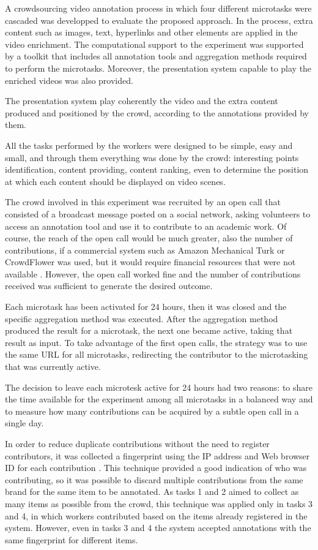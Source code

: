 A crowdsourcing video annotation process in which four different microtasks were cascaded was developped to evaluate the proposed approach. In the process, extra content such as images, text, hyperlinks and other elements are applied in the video enrichment. The computational support to the experiment was supported by a toolkit that includes all annotation tools and aggregation methods required to perform the microtasks. Moreover, the presentation system capable to play the enriched videos was also provided.

The presentation system play coherently the video and the extra content produced and positioned by the crowd, according to the annotations provided by them.

All the tasks performed by the workers were designed to be simple, easy and small, and through them everything was done by the crowd: interesting points identification, content providing, content ranking, even to determine the position at which each content should be displayed on video scenes.

The crowd involved in this experiment was recruited by an open call that consisted of a broadcast message posted on a social network, asking volunteers to access an annotation tool and use it to contribute to an academic work. Of course, the reach of the open call would be much greater, also the number of contributions, if a commercial system such as Amazon Mechanical Turk or CrowdFlower was used, but it would require financial resources that were not available \cite{Difallah:2015:DMC:2736277.2741685}. However, the open call worked fine and the number of contributions received was sufficient to generate the desired outcome.

Each microtask has been activated for 24 hours, then it was closed and the specific aggregation method was executed. After the aggregation method produced the result for a microtask, the next one became active, taking that result as input. To take advantage of the first open calls, the strategy was to use the same URL for all microtasks, redirecting the contributor to the microtasking that was currently active.

The decision to leave each microtesk active for 24 hours had two reasons: to share the time available for the experiment among all microtasks in a balanced way and to measure how many contributions can be acquired by a subtle open call in a single day. 

In order to reduce duplicate contributions without the need to register contributors, it was collected a fingerprint using the IP address and Web browser ID for each contribution \cite{mulazzani2013fast,segundo2016crowdsourcing}. This technique provided a good indication of who was contributing, so it was possible to discard multiple contributions from the same brand for the same item to be annotated. As tasks 1 and 2 aimed to collect as many items as possible from the crowd, this technique was applied only in tasks 3 and 4, in which workers contributed based on the items already registered in the system. However, even in tasks 3 and 4 the system accepted annotations with the same fingerprint for different items.

